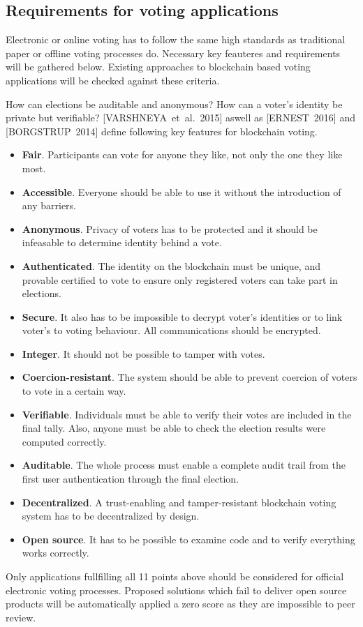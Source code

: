 \documentclass[9pt,oneside]{amsart}
\begin{document}
\begin{multicols}{2}
\subsection{Requirements for voting applications}
\label{sec:req}
Electronic or online voting has to follow the same high standards as traditional paper or offline voting processes do. Necessary key feauteres and requirements will be gathered below. Existing approaches to blockchain based voting applications will be checked against these criteria.\par
How can elections be auditable and anonymous? How can a voter's identity be private but verifiable? [VARSHNEYA~et~al.~2015] aswell as [ERNEST~2016] and [BORGSTRUP~2014] define following key features for blockchain voting.
\begin{itemize}
\item \textbf{Fair}. Participants can vote for anyone they like, not only the one they like most.
\item \textbf{Accessible}. Everyone should be able to use it without the introduction of any barriers.
\item \textbf{Anonymous}. Privacy of voters has to be protected and it should be infeasable to determine identity behind a vote.
\item \textbf{Authenticated}. The identity on the blockchain must be unique, and provable certified to vote to ensure only registered voters can take part in elections.
\item \textbf{Secure}. It also has to be impossible to decrypt voter's identities or to link voter's to voting behaviour. All communications should be encrypted.
\item \textbf{Integer}. It should not be possible to tamper with votes.
\item \textbf{Coercion-resistant}. The system should be able to prevent coercion of voters to vote in a certain way.
\item \textbf{Verifiable}. Individuals must be able to verify their votes are included in the final tally. Also, anyone must be able to check the election results were computed correctly.
\item \textbf{Auditable}. The whole process must enable a complete audit trail from the first user authentication through the final election.
\item \textbf{Decentralized}. A trust-enabling and tamper-resistant blockchain voting system has to be decentralized by design.
\item \textbf{Open source}. It has to be possible to examine code and to verify everything works correctly.
\end{itemize}
Only applications fullfilling all 11 points above should be considered for official electronic voting processes. Proposed solutions which fail to deliver open source products will be automatically applied a zero score as they are impossible to peer review.


\end{multicols}
\end{document}
